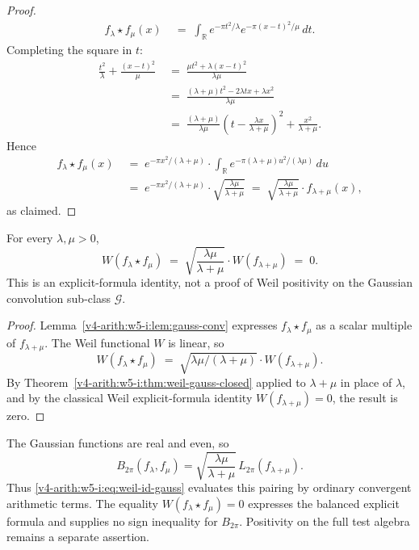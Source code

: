 \begin{proof}
\begin{align*}
f_{\lambda}\star f_{\mu}(x)
&\;=\;\int_{\mathbb{R}}e^{-\pi t^{2}/\lambda}e^{-\pi(x-t)^{2}/\mu}\,dt.
\end{align*}
Completing the square in \(t\):
\begin{align*}
\frac{t^{2}}{\lambda}+\frac{(x-t)^{2}}{\mu}
&\;=\;\frac{\mu t^{2}+\lambda(x-t)^{2}}{\lambda\mu}\\
&\;=\;\frac{(\lambda+\mu)t^{2}-2\lambda t x+\lambda x^{2}}{\lambda\mu}\\
&\;=\;\frac{(\lambda+\mu)}{\lambda\mu}\!\left(t-\frac{\lambda x}{\lambda+\mu}\right)^{2}+\frac{x^{2}}{\lambda+\mu}.
\end{align*}
Hence
\begin{align*}
f_{\lambda}\star f_{\mu}(x)
&\;=\;e^{-\pi x^{2}/(\lambda+\mu)}\cdot\int_{\mathbb{R}}e^{-\pi(\lambda+\mu)u^{2}/(\lambda\mu)}\,du\\
&\;=\;e^{-\pi x^{2}/(\lambda+\mu)}\cdot\sqrt{\frac{\lambda\mu}{\lambda+\mu}}
\;=\;\sqrt{\frac{\lambda\mu}{\lambda+\mu}}\cdot f_{\lambda+\mu}(x),
\end{align*}
as claimed.
\end{proof}

\begin{proposition}
\label{v4-arith:w5-i:prop:gauss-pos}
For every \(\lambda,\mu>0\),
\begin{equation}
\label{v4-arith:w5-i:eq:gauss-pos}
W(f_{\lambda}\star f_{\mu})\;=\;\sqrt{\frac{\lambda\mu}{\lambda+\mu}}\cdot W(f_{\lambda+\mu})\;=\;0.
\end{equation}
This is an explicit-formula identity, not a proof of Weil positivity on
the Gaussian convolution sub-class \(\mathcal{G}\).
\end{proposition}

\begin{proof}
Lemma~\ref{v4-arith:w5-i:lem:gauss-conv} expresses
\(f_{\lambda}\star f_{\mu}\) as a scalar multiple of
\(f_{\lambda+\mu}\). The Weil functional \(W\) is linear, so
\[
W(f_{\lambda}\star f_{\mu})\;=\;\sqrt{\lambda\mu/(\lambda+\mu)}\cdot W(f_{\lambda+\mu}).
\]
By Theorem~\ref{v4-arith:w5-i:thm:weil-gauss-closed} applied to
\(\lambda+\mu\) in place of \(\lambda\), and by the classical Weil
explicit-formula identity \(W(f_{\lambda+\mu})=0\), the result is zero.
\end{proof}

\begin{remark}
\label{v4-arith:w5-i:rem:gauss-pos-domain}
The Gaussian functions are real and even, so
\begin{equation*}
 B_{2\pi}(f_\lambda,f_\mu)
 =\sqrt{\frac{\lambda\mu}{\lambda+\mu}}\,
       L_{2\pi}(f_{\lambda+\mu}).
\end{equation*}
Thus \eqref{v4-arith:w5-i:eq:weil-id-gauss} evaluates this pairing
by ordinary convergent arithmetic terms.
The equality $W(f_\lambda\star f_\mu)=0$ expresses the balanced
explicit formula and supplies no sign inequality for $B_{2\pi}$.
Positivity on the full test algebra remains a separate assertion.
\end{remark}

